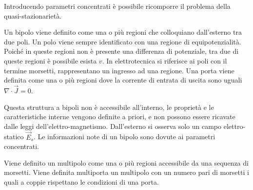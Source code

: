 \documentclass{article}
\numberwithin{equation}{subsection}
\begin{document}
Introducendo parametri concentrati è possibile ricomporre il problema della quasi-stazionarietà. 

Un bipolo viene definito come una o più regioni che colloquiano dall'esterno tra due poli. Un polo viene sempre identificato con una regione di equipotenzialità. Poiché in 
queste regioni non è presente una differenza di potenziale, tra due di queste regioni è possibile esista $v$. In elettrotecnica si riferisce ai poli con il termine morsetti, 
rappresentano un ingresso ad una regione. Una porta viene definita come una o più regioni dove la corrente di entrata di uscita sono uguali $\nabla\cdot\vec{J}=0$.

\begin{center}
\end{center}
Questa struttura a bipoli non è accessibile all'interno, le proprietà e le caratteristiche interne vengono definite a priori, e non possono essere ricavate dalle leggi 
dell'elettro-magnetismo. Dall'esterno si osserva solo un campo elettro-statico $\vec{E}_s$. Le informazioni note di un bipolo sono dovute ai parametri concentrati. 

Viene definito un multipolo come una o più regioni accessibile da una sequenza di morsetti. Viene definita multiporta un multipolo con un numero pari di morsetti i quali 
a coppie rispettano le condizioni di una porta. 

\begin{center}
\end{center}
\end{document}
